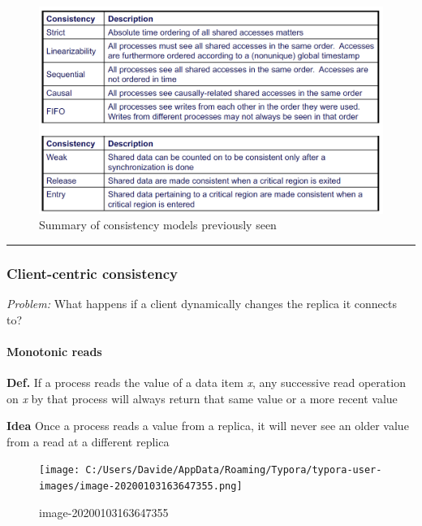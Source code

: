 \begin{figure}[htbp]
    \centering
    \includegraphics[width=\textwidth]{src/images/consistency-replication/summary.png}
    \caption{Summary of consistency models previously seen}
\end{figure}

\begin{center}\rule{3in}{0.4pt}\end{center}

\subsubsection{Client-centric
consistency}\label{client-centric-consistency}

\emph{Problem:} What happens if a client dynamically changes the replica
it connects to?

\paragraph{Monotonic reads}\label{monotonic-reads}

\textbf{Def.} If a process reads the value of a data item \emph{x}, any
successive read operation on \emph{x} by that process will always return
that same value or a more recent value

\textbf{Idea} Once a process reads a value from a replica, it will never
see an older value from a read at a different replica

\begin{figure}[htbp]
\centering
\texttt{[image: C:/Users/Davide/AppData/Roaming/Typora/typora-user-images/image-20200103163647355.png]}
\caption{image-20200103163647355}
\end{figure}

